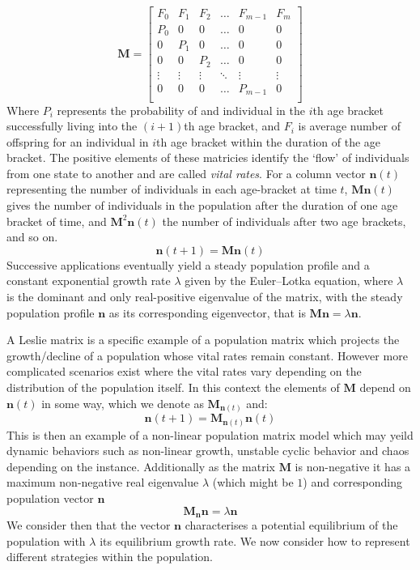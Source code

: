 \begin{equation*}
\mathbf{M}=\begin{bmatrix}
    F_0 & F_1 & F_2 & \dots & F_{m-1} & F_m  \\
    P_0 &  0  &  0  & \dots &  0      &  0   \\
     0  & P_1 &  0  & \dots &  0      &  0   \\
     0  &  0  & P_2 & \dots &  0      &  0   \\
    \vdots & \vdots & \vdots & \ddots & \vdots & \vdots \\
     0  &  0  &  0  & \dots  & P_{m-1} &  0   \\
\end{bmatrix}
\end{equation*}
Where $P_i$ represents the probability of and individual in the $i$th age bracket successfully living into the $(i+1)$th age bracket, and $F_i$ is average number of offspring for an individual in $i$th age bracket within the duration of the age bracket.
The positive elements of these matricies identify the `flow' of individuals from one state to another and are called \textit{vital rates}.
For a column vector $\mathbf{n}(t)$ representing the number of individuals in each age-bracket at time $t$, $\mathbf{M}\mathbf{n}(t)$ gives the number of individuals in the population after the duration of one age bracket of time, and $\mathbf{M}^2\mathbf{n}(t)$ the number of individuals after two age brackets, and so on. $$\mathbf{n}(t+1)=\mathbf{M}\mathbf{n}(t)$$
Successive applications eventually yield a steady population profile and a constant exponential growth rate $\lambda$ given by the Euler–Lotka equation, where $\lambda$ is the dominant and only real-positive eigenvalue of the matrix, with the steady population profile $\mathbf{n}$ as its corresponding eigenvector, that is $\mathbf{M}\mathbf{n}=\lambda \mathbf{n}$.

A Leslie matrix is a specific example of a population matrix which projects the growth/decline of a population whose vital rates remain constant.
However more complicated scenarios exist where the vital rates vary depending on the distribution of the population itself.
In this context the elements of $\mathbf{M}$ depend on $\mathbf{n}(t)$ in some way, which we denote as $\mathbf{M}_{\mathbf{n}(t)}$ and:
$$\mathbf{n}(t+1) = \mathbf{M}_{\mathbf{n}(t)}\mathbf{n}(t)$$
This is then an example of a non-linear population matrix model which may yeild dynamic behaviors such as non-linear growth, unstable cyclic behavior and chaos depending on the instance.
Additionally as the matrix $\mathbf{M}$ is non-negative it has a maximum non-negative real eigenvalue $\lambda$ (which might be $1$) and corresponding population vector $\mathbf{n}$
$$\mathbf{M}_{\mathbf{n}}\mathbf{n} = \lambda\mathbf{n}$$
We consider then that the vector $\mathbf{n}$ characterises a potential equilibrium of the population with $\lambda$ its equilibrium growth rate. We now consider how to represent different strategies within the population.

